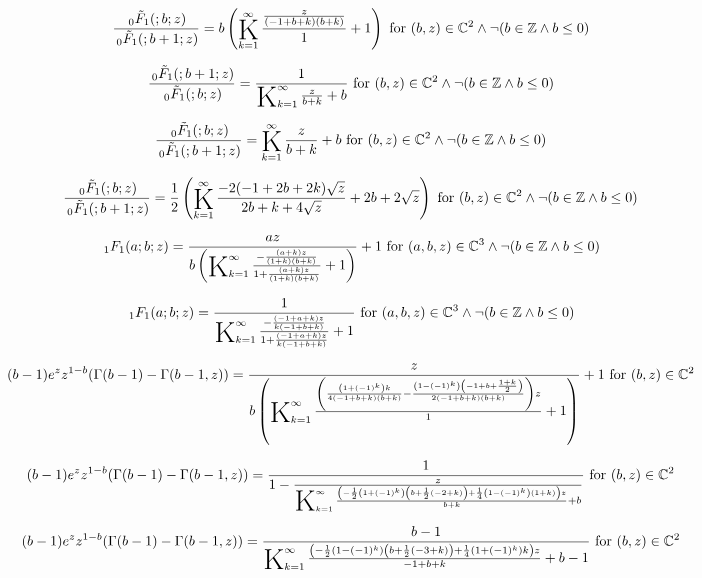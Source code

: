 \documentclass{article}
\newcommand{\bigK}{\mathop{\raisebox{-5pt}{\huge K}}}
\begin{document}
\[\frac{\, _0\tilde{F}_1(;b;z)}{\, _0\tilde{F}_1(;b+1;z)}=b \left(\bigK_{k=1}^{\infty}\frac{\frac{z}{(-1+b+k) (b+k)}}{1}+1\right)\text{ for }(b,z)\in \mathbb{C}^2\land \neg (b\in \mathbb{Z}\land b\leq 0)\] 

\[\frac{\, _0\tilde{F}_1(;b+1;z)}{\, _0\tilde{F}_1(;b;z)}=\frac{1}{\bigK_{k=1}^{\infty}\frac{z}{b+k}+b}\text{ for }(b,z)\in \mathbb{C}^2\land \neg (b\in \mathbb{Z}\land b\leq 0)\] 

\[\frac{\, _0\tilde{F}_1(;b;z)}{\, _0\tilde{F}_1(;b+1;z)}=\bigK_{k=1}^{\infty}\frac{z}{b+k}+b\text{ for }(b,z)\in \mathbb{C}^2\land \neg (b\in \mathbb{Z}\land b\leq 0)\] 

\[\frac{\, _0\tilde{F}_1(;b;z)}{\, _0\tilde{F}_1(;b+1;z)}=\frac{1}{2} \left(\bigK_{k=1}^{\infty}\frac{-2 (-1+2 b+2 k) \sqrt{z}}{2 b+k+4 \sqrt{z}}+2 b+2 \sqrt{z}\right)\text{ for }(b,z)\in \mathbb{C}^2\land \neg (b\in \mathbb{Z}\land b\leq 0)\] 

\[\, _1F_1(a;b;z)=\frac{a z}{b \left(\bigK_{k=1}^{\infty}\frac{-\frac{(a+k) z}{(1+k) (b+k)}}{1+\frac{(a+k) z}{(1+k) (b+k)}}+1\right)}+1\text{ for }(a,b,z)\in \mathbb{C}^3\land \neg (b\in \mathbb{Z}\land b\leq 0)\] 

\[\, _1F_1(a;b;z)=\frac{1}{\bigK_{k=1}^{\infty}\frac{-\frac{(-1+a+k) z}{k (-1+b+k)}}{1+\frac{(-1+a+k) z}{k (-1+b+k)}}+1}\text{ for }(a,b,z)\in \mathbb{C}^3\land \neg (b\in \mathbb{Z}\land b\leq 0)\] 

\[(b-1) e^z z^{1-b} (\Gamma (b-1)-\Gamma (b-1,z))=\frac{z}{b \left(\bigK_{k=1}^{\infty}\frac{\left(\frac{\left(1+(-1)^k\right) k}{4 (-1+b+k) (b+k)}-\frac{\left(1-(-1)^k\right) \left(-1+b+\frac{1+k}{2}\right)}{2 (-1+b+k) (b+k)}\right) z}{1}+1\right)}+1\text{ for }(b,z)\in \mathbb{C}^2\] 

\[(b-1) e^z z^{1-b} (\Gamma (b-1)-\Gamma (b-1,z))=\frac{1}{1-\frac{z}{\bigK_{k=1}^{\infty}\frac{\left(-\frac{1}{2} \left(1+(-1)^k\right) \left(b+\frac{1}{2} (-2+k)\right)+\frac{1}{4} \left(1-(-1)^k\right) (1+k)\right) z}{b+k}+b}}\text{ for }(b,z)\in \mathbb{C}^2\] 

\[(b-1) e^z z^{1-b} (\Gamma (b-1)-\Gamma (b-1,z))=\frac{b-1}{\bigK_{k=1}^{\infty}\frac{\left(-\frac{1}{2} \left(1-(-1)^k\right) \left(b+\frac{1}{2} (-3+k)\right)+\frac{1}{4} \left(1+(-1)^k\right) k\right) z}{-1+b+k}+b-1}\text{ for }(b,z)\in \mathbb{C}^2\] 
\end{document}
